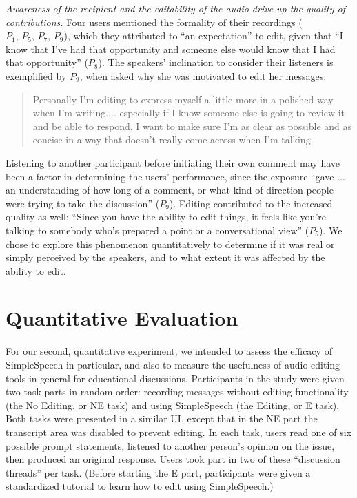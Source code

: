 \emph{Awareness of the recipient and the editability of the audio drive up the quality of contributions.}
Four users mentioned the formality of their recordings ($P_1,\,P_5,\,P_7,\,P_9$), which they attributed to ``an expectation'' to edit, given that ``I know that I've had that opportunity and someone else would know that I had that opportunity'' ($P_8$).
The speakers' inclination to consider their listeners is exemplified by $P_9$, when asked why she was motivated to edit her messages:
\begin{quote}
	Personally I'm editing to express myself a little more in a polished way when I'm writing.... especially if I know someone else is going to review it and be able to respond, I want to make sure I'm as clear as possible and as concise in a way that doesn't really come across when I'm talking.
\end{quote}
Listening to another participant before initiating their own comment may have been a factor in determining the users' performance, since the exposure ``gave ... an understanding of how long of a comment, or what kind of direction people were trying to take the discussion'' ($P_9$). 
Editing contributed to the increased quality as well: ``Since you have the ability to edit things, it feels like you're talking to somebody who's prepared a point or a conversational view'' ($P_5$). 
We chose to explore this phenomenon quantitatively to determine if it was real or simply perceived by the speakers, and to what extent it was affected by the ability to edit.

\section{Quantitative Evaluation}
For our second, quantitative experiment, we intended to assess the efficacy of SimpleSpeech in particular, and also to measure the usefulness of audio editing tools in general for educational discussions.
Participants in the study were given two task parts in random order: recording messages without editing functionality (the No Editing, or NE task) and using SimpleSpeech (the Editing, or E task). 
Both tasks were presented in a similar UI, except that in the NE part the transcript area was disabled to prevent editing.
In each task, users read one of six possible prompt statements, listened to another person's opinion on the issue, then produced an original response.
Users took part in two of these ``discussion threads'' per task.
(Before starting the E part, participants were given a standardized tutorial to learn how to edit using SimpleSpeech.)

